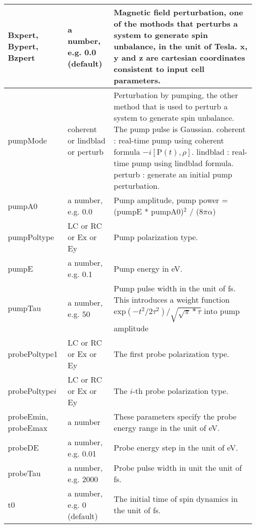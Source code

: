 \documentclass{article}
\begin{document}
\begin{xltabular}{\textwidth}{X X X}
		Bxpert, Bypert, Bzpert & a number, e.g. 0.0 (default) & Magnetic field perturbation, one of the mothods that perturbs a system to generate spin unbalance, in the unit of Tesla. x, y and z are cartesian coordinates consistent to input cell parameters.\\
		\midrule
		
		pumpMode & coherent or lindblad or perturb & Perturbation by pumping, the other method that is used to perturb a system to generate spin unbalance. The pump pulse is Gaussian. coherent : real-time pump using coherent formula $-i[\mathrm{P}(t),\rho]$. lindblad : real-time pump using lindblad formula. perturb : generate an initial pump perturbation.\\
		\midrule
		
		pumpA0 & a number, e.g. 0.0 & Pump amplitude, pump power = (pumpE * pumpA0)$^2$ / ($8\pi \alpha$)\\
		\midrule
		
		pumpPoltype & LC or RC or Ex or Ey & Pump polarization type.\\
		\midrule
		
		pumpE & a number, e.g. 0.1 & Pump energy in eV.\\
		\midrule
		
		pumpTau & a number, e.g. 50 & Pump pulse width in the unit of fs. This introduces a weight function $\mathrm{exp}(-t^2/2\tau^2) / \sqrt{\sqrt{\pi} * \tau}$ into pump amplitude\\
		\midrule
		
		probePoltype1 & LC or RC or Ex or Ey & The first probe polarization type.\\
		\midrule
		
		probePoltype$i$ & LC or RC or Ex or Ey & The $i$-th probe polarization type.\\
		\midrule
		
		probeEmin, probeEmax & a number & These parameters specify the probe energy range in the unit of eV.\\
		\midrule
		
		probeDE & a number, e.g. 0.01 & Probe energy step in the unit of eV.\\
		\midrule
		
		probeTau & a number, e.g. 2000 & Probe pulse width in unit the unit of fs.\\
		\midrule\midrule
		
		t0 & a number, e.g. 0 (default) & The initial time of spin dynamics in the unit of fs.\\
		\midrule
		

\end{xltabular}
\end{document}
